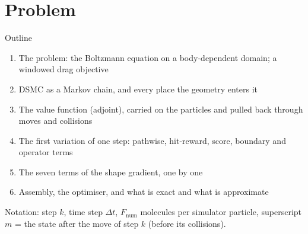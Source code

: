 
\section{Problem}

\begin{frame}{Outline}
\begin{enumerate}
\item The problem: the Boltzmann equation on a body-dependent domain; a windowed drag objective
\item DSMC as a Markov chain, and every place the geometry enters it
\item The value function (adjoint), carried on the particles and pulled back through
  moves and collisions
\item The first variation of one step: pathwise, hit-reward, score, boundary and operator terms
\item The seven terms of the shape gradient, one by one
\item Assembly, the optimiser, and what is exact and what is approximate
\end{enumerate}
\vspace{1em}
Notation: step $k$, time step $\Delta t$, $F_{\mathrm{num}}$ molecules per simulator
particle, superscript $m$ = the state after the move of step $k$ (before its collisions).
\end{frame}

